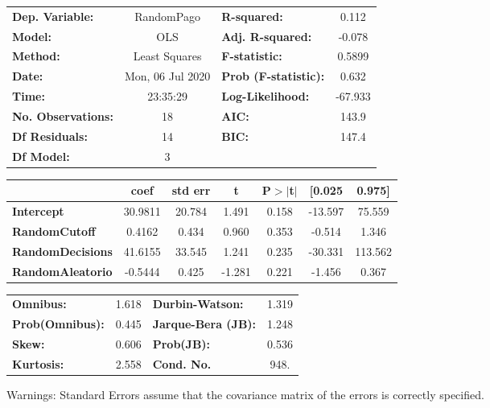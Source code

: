 \documentclass{report}
\begin{document}
\begin{center}
\begin{tabular}{lclc}
\toprule
\textbf{Dep. Variable:}    &    RandomPago    & \textbf{  R-squared:         } &     0.112   \\
\textbf{Model:}            &       OLS        & \textbf{  Adj. R-squared:    } &    -0.078   \\
\textbf{Method:}           &  Least Squares   & \textbf{  F-statistic:       } &    0.5899   \\
\textbf{Date:}             & Mon, 06 Jul 2020 & \textbf{  Prob (F-statistic):} &    0.632    \\
\textbf{Time:}             &     23:35:29     & \textbf{  Log-Likelihood:    } &   -67.933   \\
\textbf{No. Observations:} &          18      & \textbf{  AIC:               } &     143.9   \\
\textbf{Df Residuals:}     &          14      & \textbf{  BIC:               } &     147.4   \\
\textbf{Df Model:}         &           3      & \textbf{                     } &             \\
\bottomrule
\end{tabular}
\begin{tabular}{lcccccc}
                         & \textbf{coef} & \textbf{std err} & \textbf{t} & \textbf{P$> |$t$|$} & \textbf{[0.025} & \textbf{0.975]}  \\
\midrule
\textbf{Intercept}       &      30.9811  &       20.784     &     1.491  &         0.158        &      -13.597    &       75.559     \\
\textbf{RandomCutoff}    &       0.4162  &        0.434     &     0.960  &         0.353        &       -0.514    &        1.346     \\
\textbf{RandomDecisions} &      41.6155  &       33.545     &     1.241  &         0.235        &      -30.331    &      113.562     \\
\textbf{RandomAleatorio} &      -0.5444  &        0.425     &    -1.281  &         0.221        &       -1.456    &        0.367     \\
\bottomrule
\end{tabular}
\begin{tabular}{lclc}
\textbf{Omnibus:}       &  1.618 & \textbf{  Durbin-Watson:     } &    1.319  \\
\textbf{Prob(Omnibus):} &  0.445 & \textbf{  Jarque-Bera (JB):  } &    1.248  \\
\textbf{Skew:}          &  0.606 & \textbf{  Prob(JB):          } &    0.536  \\
\textbf{Kurtosis:}      &  2.558 & \textbf{  Cond. No.          } &     948.  \\
\bottomrule
\end{tabular}
\end{center}

Warnings: \newline
 [1] Standard Errors assume that the covariance matrix of the errors is correctly specified.
\end{document}
